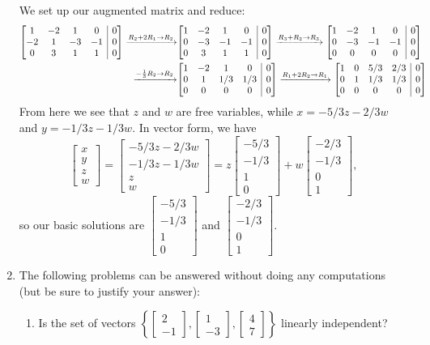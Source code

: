 \documentclass[12pt]{article}
\makeatletter
\newenvironment{amatrix}[1]{%
  \left[\begin{array}{@{}*{#1}{c}|c@{}}
}{%
  \end{array}\right]
}
\newcommand{\bbm}{\begin{bmatrix}}
\newcommand{\ebm}{\end{bmatrix}}
\newcommand{\bam}{\begin{amatrix}}
\newcommand{\eam}{\end{amatrix}}
\makeatother
\begin{document}
\begin{enumerate}
We set up our augmented matrix and reduce:
\begin{align*}
\bam{4}
1&-2&1&0&0\\
-2&1&-3&-1&0\\
0&3&1&1&0
\eam \xrightarrow{R_2+2R_1\to R_2}& 
\bam{4}
1&-2&1&0&0\\
0&-3&-1&-1&0\\
0&3&1&1&0
\eam \xrightarrow{R_3+R_2\to R_3}
\bam{4}
1&-2&1&0&0\\
0&-3&-1&-1&0\\
0&0&0&0&0
\eam\\
\xrightarrow{-\frac13 R_2\to R_2}&
\bam{4}
1&-2&1&0&0\\
0&1&1/3&1/3&0\\
0&0&0&0&0
\eam \xrightarrow{R_1+2R_2\to R_1}
\bam{4}
1&0&5/3&2/3&0\\
0&1&1/3&1/3&0\\
0&0&0&0&0
\eam
\end{align*}
From here we see that $z$ and $w$ are free variables, while $x=-5/3z-2/3w$ and $y=-1/3z-1/3w$. In vector form, we have
\[
\bbm x\\y\\z\\w\ebm = \bbm -5/3z-2/3w\\-1/3z-1/3w\\z\\w\ebm = z\bbm-5/3\\-1/3\\1\\0\ebm + w\bbm -2/3\\-1/3\\0\\1\ebm,
\]
so our basic solutions are $\bbm-5/3\\-1/3\\1\\0\ebm$ and $\bbm -2/3\\-1/3\\0\\1\ebm$.

\newpage

\item The following problems can be answered without doing any computations (but be sure to justify your answer):
\begin{enumerate}
\item Is the set of vectors $\left\{\bbm 2\\-1\ebm, \bbm 1\\-3\ebm, \bbm 4\\7\ebm\right\}$ linearly independent?


\end{enumerate}
\end{enumerate}
\end{document}

